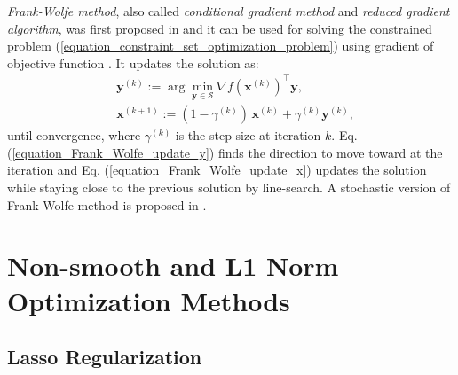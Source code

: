 \documentclass[lang=cn,10pt]{gorgeousnbook}
\numberwithin{equation}{section}%
\numberwithin{figure}{section}%
\begin{document}
\textit{Frank-Wolfe method}, also called \textit{conditional gradient method} and \textit{reduced gradient algorithm}, was first proposed in \cite{frank1956algorithm} and it can be used for solving the constrained problem (\ref{equation_constraint_set_optimization_problem}) using gradient of objective function \cite{levitin1966constrained}. 
It updates the solution as:
\begin{align}
& \boldsymbol{y}^{(k)} := \arg \min_{\boldsymbol{y} \in \mathcal{S}} \nabla f(\boldsymbol{x}^{(k)})^\top \boldsymbol{y}, \label{equation_Frank_Wolfe_update_y} \\
& \boldsymbol{x}^{(k+1)} := (1 - \gamma^{(k)})\, \boldsymbol{x}^{(k)} + \gamma^{(k)} \boldsymbol{y}^{(k)}, \label{equation_Frank_Wolfe_update_x}
\end{align}
until convergence, where $\gamma^{(k)}$ is the step size at iteration $k$. 
Eq. (\ref{equation_Frank_Wolfe_update_y}) finds the direction to move toward at the iteration and Eq. (\ref{equation_Frank_Wolfe_update_x}) updates the solution while staying close to the previous solution by line-search. 
A stochastic version of Frank-Wolfe method is proposed in \cite{reddi2016stochastic}. 

\section{Non-smooth and L1 Norm Optimization Methods}

\subsection{Lasso Regularization}\label{section_lasso_regularization}
\end{document}
